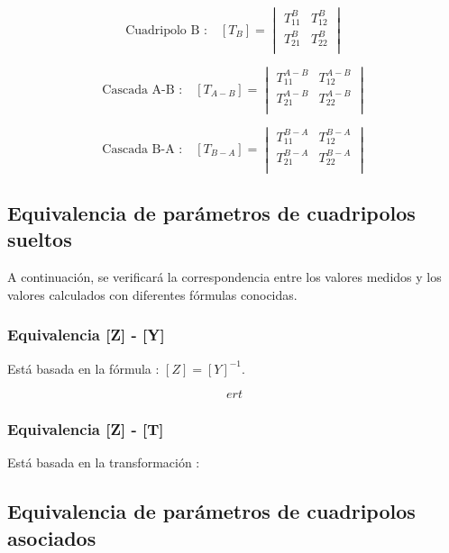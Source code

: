 \documentclass[a4paper]{article}
\begin{document}
\begin{equation}
\text{Cuadripolo B :}\quad [T_{B}] =
\begin{vmatrix}
	T^{B}_{11} & T^{B}_{12}\\
	T^{B}_{21} & T^{B}_{22}\\
\end{vmatrix}
\end{equation}

\begin{equation}
\text{Cascada A-B :}\quad [T_{A-B}] =
\begin{vmatrix}
	T^{A-B}_{11} & T^{A-B}_{12}\\
	T^{A-B}_{21} & T^{A-B}_{22}\\
\end{vmatrix}
\end{equation}

\begin{equation}
\text{Cascada B-A :}\quad [T_{B-A}] =
\begin{vmatrix}
	T^{B-A}_{11} & T^{B-A}_{12}\\
	T^{B-A}_{21} & T^{B-A}_{22}\\
\end{vmatrix}
\end{equation}

\subsection*{Equivalencia de parámetros de cuadripolos sueltos}

A continuación, se verificará la correspondencia entre los valores medidos y los valores calculados con diferentes fórmulas conocidas.

\subsubsection*{Equivalencia [Z] - [Y]}

Está basada en la fórmula : $[Z]=[Y]^{-1}$.

\begin{equation}
ert
\end{equation}

\subsubsection*{Equivalencia [Z] - [T]}

Está basada en la transformación : 

\subsection*{Equivalencia de parámetros de cuadripolos asociados}
\end{document}
